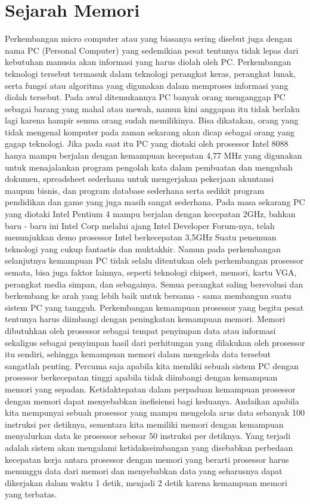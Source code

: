 \section{Sejarah Memori}
Perkembangan micro computer atau yang biasanya sering disebut juga dengan nama PC (Personal Computer) yang sedemikian pesat tentunya tidak lepas dari kebutuhan manusia akan informasi yang harus diolah oleh PC. Perkembangan teknologi tersebut termasuk dalam teknologi perangkat keras, perangkat lunak, serta fungsi atau algoritma yang digunakan dalam memproses informasi yang diolah tersebut.
Pada awal ditemukannya PC banyak orang menganggap PC sebagai barang yang mahal atau mewah, namun kini anggapan itu tidak berlaku lagi karena hampir semua orang sudah memilikinya. Bisa dikatakan, orang yang tidak mengenal komputer pada zaman sekarang akan dicap sebagai orang yang gagap teknologi. Jika pada saat itu PC yang diotaki oleh prosessor Intel 8088 hanya mampu berjalan dengan kemampuan kecepatan 4,77 MHz yang digunakan untuk menajalankan program pengolah kata dalam pembuatan dan mengubah dokumen, spreadsheet sederhana untuk mengerjakan pekerjaan akuntansi maupun bisnis, dan program database sederhana serta sedikit program pendidikan dan game yang juga masih sangat sederhana. Pada masa sekarang PC yang diotaki Intel Pentium 4 mampu berjalan dengan kecepatan 2GHz, bahkan baru - baru ini Intel Corp melalui ajang Intel Developer Forum-nya, telah menunjukkan demo prosessor Intel berkecepatan 3,5GHz Suatu penemuan teknologi yang cukup fantastis dan muktakhir. Namun pada perkembangan selanjutnya kemampuan PC tidak selalu ditentukan oleh perkembangan prosessor semata, bisa juga faktor lainnya, seperti teknologi chipset, memori, kartu VGA, perangkat media simpan, dan sebagainya. Semua perangkat saling berevolusi dan berkembang ke arah yang lebih baik untuk bersama - sama membangun suatu sistem PC yang tangguh. Perkembangan kemampuan prosessor yang begitu pesat tentunya harus diimbangi dengan peningkatan kemampuan memori. Memori dibutuhkan oleh prosessor sebagai tempat penyimpan data atau informasi sekaligus sebagai penyimpan hasil dari perhitungan yang dilakukan oleh prosessor itu sendiri, sehingga kemampuan memori dalam mengelola data tersebut sangatlah penting. Percuma saja apabila kita memliki sebuah sistem PC dengan prosessor berkecepatan tinggi apabila tidak diimbangi dengan kemampuan memori yang sepadan. Ketidaktepatan dalam perpaduan kemampuan prosessor dengan memori dapat menyebabkan inefisiensi bagi keduanya. Andaikan apabila kita mempunyai sebuah prosessor yang mampu mengelola arus data sebanyak 100 instruksi per detiknya, sementara kita memiliki memori dengan kemampuan menyalurkan data ke prosessor sebesar 50 instruksi per detiknya. Yang terjadi adalah sistem akan mengalami ketidakseimbangan yang disebabkan perbedaan kecepatan kerja antara prosessor dengan memori yang berarti prosessor harus menunggu data dari memori dan menyebabkan data yang seharusnya dapat dikerjakan dalam waktu 1 detik, menjadi 2 detik karena kemampuan memori yang terbatas. 

